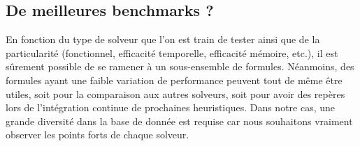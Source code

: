 \documentclass[11pt,a4paper]{article}
\begin{document}
\subsection{De meilleures benchmarks ?}

En fonction du type de solveur que l'on est train de tester ainsi que de la particularité (fonctionnel, efficacité temporelle, efficacité mémoire, etc.), il est sûrement possible de se ramener à un sous-ensemble de formules. Néanmoins, des formules ayant une faible variation de performance peuvent tout de même être utiles, soit pour la comparaison aux autres solveurs, soit pour avoir des repères lors de l'intégration continue de prochaines heuristiques. 
Dans notre cas, une grande diversité dans la base de donnée est requise car nous souhaitons vraiment observer les points forts de chaque solveur.
\end{document}
